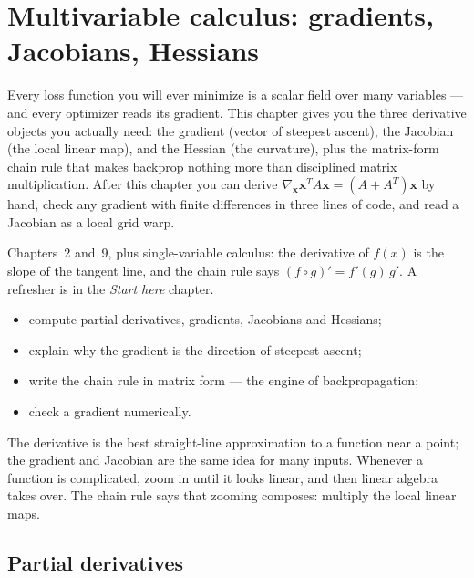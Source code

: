\chapter{Multivariable calculus: gradients, Jacobians, Hessians}\label{ch:mvcalc}

Every loss function you will ever minimize is a scalar field over many
variables --- and every optimizer reads its gradient. This chapter gives
you the three derivative objects you actually need: the gradient (vector
of steepest ascent), the Jacobian (the local linear map), and the Hessian
(the curvature), plus the matrix-form chain rule that makes backprop
nothing more than disciplined matrix multiplication. After this chapter
you can derive $\nabla_{\mathbf x}\mathbf x^{T}A\mathbf x=(A+A^{T})\mathbf
x$ by hand, check any gradient with finite differences in three lines of
code, and read a Jacobian as a local grid warp.

\begin{rulebox}
Chapters~2 and~9, plus single-variable calculus: the derivative of $f(x)$ is the slope of the tangent line, and the chain rule says $(f\circ g)'=f'(g)\,g'$. A refresher is in the \emph{Start here} chapter.
\end{rulebox}
\begin{wins}
\begin{itemize}
\item compute partial derivatives, gradients, Jacobians and Hessians;
\item explain why the gradient is the direction of steepest ascent;
\item write the chain rule in matrix form --- the engine of backpropagation;
\item check a gradient numerically.
\end{itemize}
\end{wins}
\begin{principle}
The derivative is the best straight-line approximation to a function near a point; the gradient and Jacobian are the same idea for many inputs. Whenever a function is complicated, zoom in until it looks linear, and then linear algebra takes over. The chain rule says that zooming composes: multiply the local linear maps.
\end{principle}

\section{Partial derivatives}\label{sec:mvc-partials}

